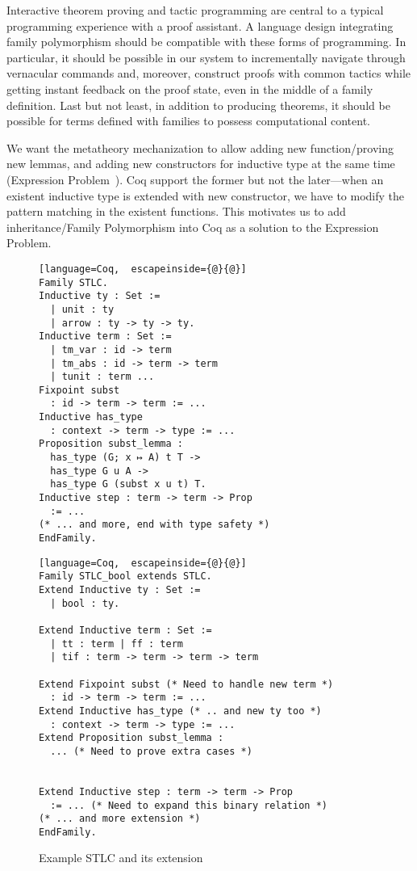 
Interactive theorem proving and tactic programming are central to
a typical programming experience with a proof assistant.
A language design integrating family polymorphism should be compatible
with these forms of programming.
In particular, it should be possible in our system to
incrementally navigate through vernacular commands and, moreover, construct proofs
with common tactics while getting instant feedback on the proof state,
even in the middle of a family definition.
Last but not least, in addition to producing theorems,
it should be possible for terms defined with families to possess computational content.

\ifShowOldWriting

\newpage

We want the metatheory mechanization to allow adding new
function/proving new lemmas, and adding new constructors for inductive
type at the same time  (Expression Problem~\cite{wadler-ep}). Coq
support the former but not the later---when an existent inductive type
is extended with new constructor, we have to modify the pattern matching
in the existent functions. This motivates us to add inheritance/Family
Polymorphism into Coq as a solution to the Expression Problem. 

\begin{figure}[!htb]
  \begin{minipage}[t]{0.47\linewidth}
\begin{lstlisting}[language=Coq,  escapeinside={@}{@}]
Family STLC.
Inductive ty : Set :=
  | unit : ty
  | arrow : ty -> ty -> ty.
Inductive term : Set := 
  | tm_var : id -> term 
  | tm_abs : id -> term -> term 
  | tunit : term ...
Fixpoint subst 
  : id -> term -> term := ...
Inductive has_type 
  : context -> term -> type := ...
Proposition subst_lemma :
  has_type (G; x ↦ A) t T ->
  has_type G u A ->
  has_type G (subst x u t) T.
Inductive step : term -> term -> Prop 
  := ...
(* ... and more, end with type safety *)
EndFamily.
\end{lstlisting}
  \end{minipage}
  \begin{minipage}[t]{0.47\linewidth}
\begin{lstlisting}[language=Coq,  escapeinside={@}{@}]
Family STLC_bool extends STLC.
Extend Inductive ty : Set :=
  | bool : ty.

Extend Inductive term : Set := 
  | tt : term | ff : term 
  | tif : term -> term -> term -> term

Extend Fixpoint subst (* Need to handle new term *)
  : id -> term -> term := ...
Extend Inductive has_type (* .. and new ty too *)
  : context -> term -> type := ...
Extend Proposition subst_lemma :
  ... (* Need to prove extra cases *)


Extend Inductive step : term -> term -> Prop 
  := ... (* Need to expand this binary relation *)
(* ... and more extension *)
EndFamily.
\end{lstlisting}
  \end{minipage}
  \caption{Example STLC and its extension}\label{fig:STLC-example}
\end{figure}

